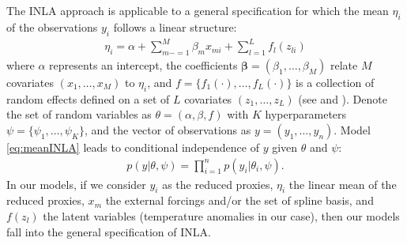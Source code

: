 \documentclass[12pt]{amsart}
\theoremstyle{plain}
\theoremstyle{definition}
\theoremstyle{remark}
\newcommand{\bl}[1]{\color{ForestGreen}\textbf{[Bo: #1]}\normalcolor}
\begin{document}
The INLA approach is applicable to a general specification for which the mean $\eta_i$ of the observations $y_i$ follows a linear structure:
\begin{align}\label{eq:meanINLA}
  \eta_i = \alpha +\sum_{m-=1}^M\beta_mx_{mi}+\sum_{l=1}^Lf_l(z_{li})
\end{align}
where $\alpha$ represents an intercept, the coefficients
$\mathbf{\beta} = (\beta_1,\ldots,\beta_M)$ relate $M$ covariates
$(x_1,\ldots,x_M)$ to $\eta_i$, and $f = \{f_1(\cdot),\ldots,f_L(\cdot)\}$ is a collection of
random effects defined on a set of $L$ covariates $(z_1,\ldots,z_L)$ (see
\cite{Rue2009} and \cite{Blangiardo2013}). 
Denote the set of random variables as
$\theta = (\alpha,\beta,f)$ with $K$ hyperparameters $\psi =
\{\psi_1,\ldots,\psi_K\}$, and the vector of observations as $y=(y_1,\ldots,y_n)$. Model \eqref{eq:meanINLA} leads to conditional independence of $y$ given $\theta$ and $\psi$:
\begin{align*}
  p(y|\theta,\psi)=\prod_{i=1}^np(y_i|\theta_i,\psi).
\end{align*}
In our models, if we consider $y_i$ as the reduced proxies,  $\eta_i$ the
linear mean of the reduced proxies, $x_m$ the external forcings and/or the set
of spline basis, and $f(z_l)$ the latent variables (temperature anomalies in
our case), then our models fall into the general specification of INLA. 
\end{document}
